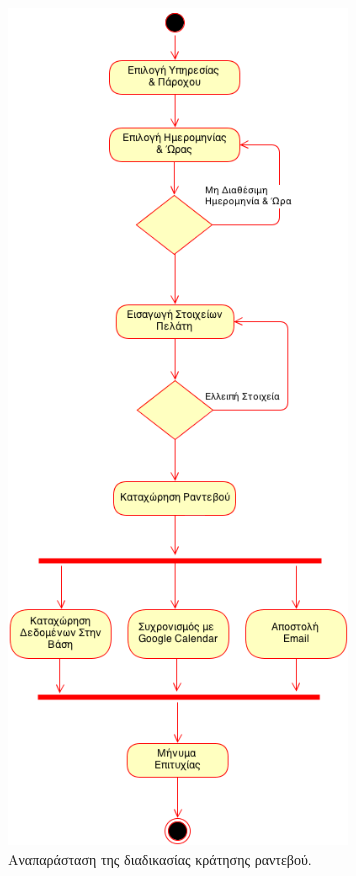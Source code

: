 \begin{figure}
\centering
\includegraphics[width=90mm]{images/ad-book-appointment.png}
\caption{Αναπαράσταση της διαδικασίας κράτησης ραντεβού.}
\label{ad-book-appointment}
\end{figure}

